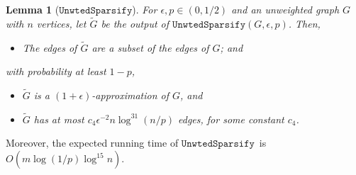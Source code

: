 \documentclass[11pt]{article}
\newtheorem{lemma}[theorem]{Lemma}
\newcommand{\unwtedsparsify}{\ensuremath{\mathtt{UnwtedSparsify}}}
\def\Gtil{\widetilde{G}}
\begin{document}
\begin{lemma}[\unwtedsparsify]\label{lem:unwtsparsify}
For $\epsilon , p \in (0,1/2)$ and an unweighted graph $G$ with $n$ vertices, let
$\Gtil$ be the output of $\unwtedsparsify (G, \epsilon , p)$.
Then,
\begin{itemize}
\item [(U.1)] The edges of $\Gtil$ are a subset of the edges of $G$; and
\end{itemize}
 with probability at least $1-p$,
\begin{itemize}
\item [(U.2)] $\Gtil$ is a $(1+\epsilon)$-approximation of $G$, and
\item [(U.3)] $\Gtil$ has at most $c_{4} \epsilon^{-2}n \log^{31} (n/p)$
  edges, for some constant $c_{4}$.
\end{itemize}
\end{lemma}
Moreover, the expected running time of \unwtedsparsify \ is 
  $O \left(m \log (1/p) \log^{15} n \right) $.
\end{document}
